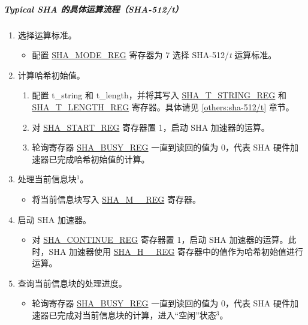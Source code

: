 \documentclass[main\_\_CN.tex]{subfiles}
\begin{document}
\subparagraph{Typical SHA 的具体运算流程（SHA-512/{\it{t}}）}

\begin{enumerate}
    \item \label{others:sha-sel-algorithm2} 选择运算标准。
    \begin{itemize}
        \item 配置 \hyperref[regdesc:SHAMODEREG]{SHA\_MODE\_REG} 寄存器为 7 选择 SHA-512/{\it{t}} 运算标准。
    \end{itemize}
    \item 计算哈希初始值。
        \begin{enumerate}
        \item 配置 t\_string 和 t\_length，并将其写入 \hyperref[regdesc:SHATSTRINGREG]{SHA\_T\_STRING\_REG} 和 \hyperref[regdesc:SHATLENGTHREG]{SHA\_T\_LENGTH\_REG} 寄存器。具体请见 \ref{others:sha-512/t} 章节。
        \item 对 \hyperref[regdesc:SHASTARTREG]{SHA\_START\_REG} 寄存器置 1，启动 SHA 加速器的运算。
        \item 轮询寄存器 \hyperref[regdesc:SHABUSYREG]{SHA\_BUSY\_REG} 一直到读回的值为 0，代表 SHA 硬件加速器已完成哈希初始值的计算。
    \end{enumerate}
    
    \item \label{others:sha-current-block1} 处理当前信息块\hyperref[others:sha-note-typical-sha]{$^1$}。
    \begin{itemize}
        \item 将当前信息块写入 \hyperref[regdesc:SHAMNREG]{SHA\_M\_\_REG} 寄存器。
    \end{itemize}
    \item 启动 SHA 加速器。
    \begin{itemize}
        \item 对 \hyperref[regdesc:SHACONTINUEREG]{SHA\_CONTINUE\_REG} 寄存器置 1，启动 SHA 加速器的运算。此时，SHA 加速器使用 \hyperref[regdesc:SHAHNREG]{SHA\_H\_\_REG} 寄存器中的值作为哈希初始值进行运算。
    \end{itemize}
    
    \item 查询当前信息块的处理进度。
    \begin{itemize}
        \item 轮询寄存器 \hyperref[regdesc:SHABUSYREG]{SHA\_BUSY\_REG} 一直到读回的值为 0，代表 SHA 硬件加速器已完成对当前信息块的计算，进入“空闲”状态\hyperref[others:sha-note-typical-sha]{$^3$}。 
    \end{itemize}
    

\end{enumerate}
\end{document}
